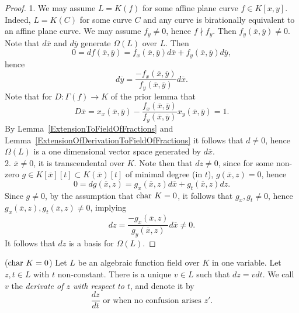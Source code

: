     \begin{proof}
        1. We may assume $L=K(f)$ for some affine plane curve $f\in K[x,y]$. Indeed, $L=K(C)$ for some curve $C$ and any curve is birationally equivalent to an affine plane curve. We may assume $f_y\neq 0$, hence $f\nmid f_y$. Then $f_y(\overline{x},\overline{y})\neq 0$. Note that $d\overline{x}$ and $d\overline{y}$ generate $\Omega(L)$ over $L$. Then 
        $$
            0 = d f(\overline{x},\overline{y}) = f_{x}(\overline{x},\overline{y})d\overline{x} + f_y(\overline{x},\overline{y})d \overline{y}, 
        $$
        hence 
        $$
            d\overline{y} = \frac{-f_x(\overline{x},\overline{y})}{f_y(\overline{x},\overline{y})}d\overline{x}.
        $$
        Note that for $D: \Gamma(f)\rightarrow K$ of the prior lemma that 
        $$
            D\overline{x} = x_x(\overline{x},\overline{y}) - \frac{f_x(\overline{x},\overline{y})}{f_y(\overline{x},\overline{y})} x_y(\overline{x},\overline{y}) = 1. 
        $$ 
        By Lemma~\ref{ExtensionToFieldOfFractions} and Lemma~\ref{ExtensionOfDerivationToFieldOfFractions} it follows that $d\neq 0$, hence $\Omega(L)$ is a one dimensional vector space generated by $d\overline{x}$.\\
        2. $\overline{x}\neq 0$, it is transcendental over $K$. Note then that $dz\neq 0$, since for some non-zero $g\in  K[\overline{x}][t]\subset K(\overline{x})[t]$ of minimal degree (in $t$), $g(\overline{x},z)=0$, hence 
        $$
            0 = dg(\overline{x},z) = g_x(\overline{x},z) d\overline{x}+ g_t(\overline{x},z)dz.
        $$
        Since $g\neq 0$, by the assumption that $\mathrm{char} \ K = 0$, it follows that $g_x,g_t\neq 0$, hence $g_x(\overline{x},z),g_t(\overline{x},z)\neq 0$, implying 
        $$
            dz = \frac{-g_x(\overline{x},z)}{g_y(\overline{x},z)}d\overline{x}\neq 0.
        $$
        It follows that $dz$ is a basis for $\Omega(L)$.
    \end{proof}

    \begin{definition}
        ($\mathrm{char}\ K = 0$) Let $L$ be an algebraic function field over $K$ in one variable. Let $z,t\in L$ with $t$ non-constant. There is a unique $v\in L$ such that $dz = vdt$. We call $v$ the \emph{derivate of $z$ with respect to $t$}, and denote it by 
        $$
            \frac{dz}{dt} \text{ or when no confusion arises } z'.
        $$  
    \end{definition}

